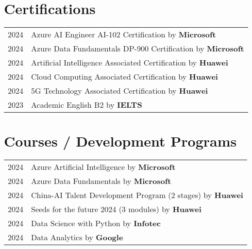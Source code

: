 \documentclass[a4paper,12pt]{article}
\begin{document}
\section{Certifications}
\begin{tabularx}{\linewidth}{@{}l X@{}}	
2024 & Azure AI Engineer AI-102 Certification by \textbf{Microsoft} \hfill \normalsize \\ 
2024 & Azure Data Fundamentals DP-900 Certification by \textbf{Microsoft} \hfill \normalsize \\
2024 & Artificial Intelligence Associated Certification by \textbf{Huawei} \hfill \normalsize \\
2024 & Cloud Computing Associated Certification by \textbf{Huawei} \hfill \\
2024 & 5G Technology Associated Certification by \textbf{Huawei} \hfill \\
2023 & Academic English B2 by \textbf{IELTS} \hfill \\
\end{tabularx}

\section{Courses / Development Programs}
\begin{tabularx}{\linewidth}{@{}l X@{}}	
2024 & Azure Artificial Intelligence by \textbf{Microsoft} \hfill \normalsize \\ 
2024 & Azure Data Fundamentals by \textbf{Microsoft} \hfill \normalsize \\
2024 & China-AI Talent Development Program (2 stages) by \textbf{Huawei} \hfill \normalsize \\
2024 & Seeds for the future 2024 (3 modules) by \textbf{Huawei} \hfill \\
2024 & Data Science with Python by \textbf{Infotec} \hfill \\
2024 & Data Analytics by \textbf{Google} \hfill \\
\end{tabularx}

\end{document}
